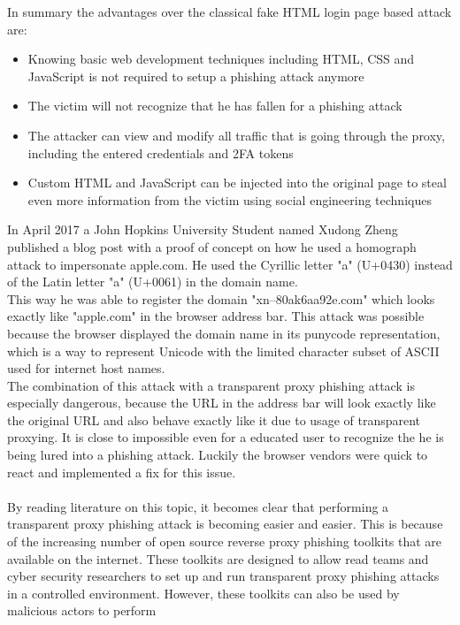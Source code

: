 \documentclass[12pt]{report}
\begin{document}
In summary the advantages over the classical fake HTML login page based attack are:
\begin{itemize}
 \item Knowing basic web development techniques including HTML, CSS and JavaScript
       is not required to setup a phishing attack anymore

  \item The victim will not recognize that he has fallen for a phishing attack

  \item The attacker can view and modify all traffic that is going through the proxy,
    including the entered credentials and 2FA tokens

  \item Custom HTML and JavaScript can be injected into the original page to steal even more
    information from the victim using social engineering techniques
\end{itemize}
In April 2017 a John Hopkins University Student named Xudong Zheng published a blog post with a proof of concept
on how he used a homograph attack to impersonate apple.com. He used the Cyrillic letter "a" (U+0430) instead of the
Latin letter "a" (U+0061) in the domain name. \\ This way he was able to register the domain "xn--80ak6aa92e.com"
which looks exactly like "apple.com" in the browser address bar. 
This attack was possible because the browser displayed the domain name in its punycode representation, which is
a way to represent Unicode with the limited character subset of ASCII used for internet host names.
\\ The combination of this attack with a transparent proxy phishing attack is especially dangerous, because
the URL in the address bar will look exactly like the original URL and also behave exactly like it due to usage of 
transparent proxying. It is close to impossible even for a educated user to recognize the he is being lured into a phishing attack.
Luckily the browser vendors were quick to react and implemented a fix for this issue. \\ \\
By reading literature on this topic, it becomes clear that performing a transparent proxy phishing attack is becoming
easier and easier. This is because of the increasing number of open source reverse proxy phishing toolkits that are
available on the internet. These toolkits are designed to allow read teams and cyber security researchers to set up and run transparent
proxy phishing attacks in a controlled environment. However, these toolkits can also be used by malicious actors to perform
\end{document}
